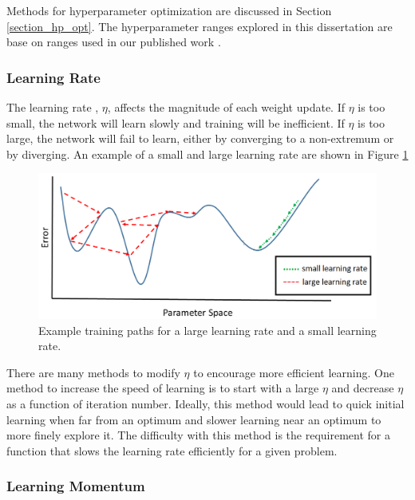 Methods for hyperparameter optimization are discussed in Section \ref{section_hp_opt}. The hyperparameter ranges explored in this dissertation are base on ranges used in our published work \cite{kamuda2017, kamuda2018, kamudaThesis2017}.

\subsubsection{Learning Rate} \label{LearningRateSubsection}

The learning rate , $\eta$, affects the magnitude of each weight update. If $\eta$ is too small, the network will learn slowly and training will be inefficient. If $\eta$ is too large, the network will fail to learn, either by converging to a non-extremum or by diverging. An example of a small and large learning rate are shown in Figure \ref{fig:Learning_rate_comparison} 

\begin{figure}[H]
	\centering
	\includegraphics[width=0.8\linewidth]{images/Learning_rate_comparison_v2}
	\caption{Example training paths for a large learning rate and a small learning rate.}
	\label{fig:Learning_rate_comparison}
\end{figure}


There are many methods to modify $\eta$ to encourage more efficient learning. One method to increase the speed of learning is to start with a large $\eta$ and decrease $\eta$ as a function of iteration number. Ideally, this method would lead to quick initial learning when far from an optimum and slower learning near an optimum to more finely explore it. The difficulty with this method is the requirement for a function that slows the learning rate efficiently for a given problem.

\subsubsection{Learning Momentum}

